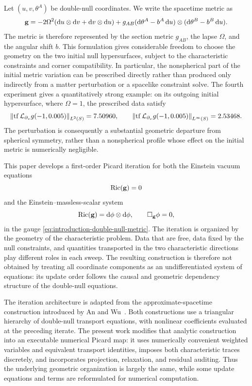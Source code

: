 Let $(u,v,\theta^A)$ be double-null coordinates.  We write the spacetime
metric as
\begin{equation}\label{eq:introduction-double-null-metric}
  \bg=-2\Omega^2(\dd u\otimes\dd v+\dd v\otimes\dd u)
  +g_{AB}(\dd\theta^A-b^A\dd u)\otimes
   (\dd\theta^B-b^B\dd u).
\end{equation}
The metric is therefore represented by the section metric $g_{AB}$, the
lapse $\Omega$, and the angular shift $b$.  This formulation gives
considerable freedom to choose the geometry on the two initial null
hypersurfaces, subject to the characteristic constraints and corner
compatibility.  In particular, the nonspherical part of the initial metric
variation can be prescribed directly rather than produced only indirectly
from a matter perturbation or a spacelike constraint solve.  The fourth
experiment gives a quantitatively strong example: on its outgoing initial
hypersurface, where $\Omega=1$, the prescribed data satisfy
\begin{equation}\label{eq:introduction-strong-asymmetry}
  \left\lVert \operatorname{tf}\mathcal L_{\partial_v}g(-1,0.005)\right\rVert_{L^2(S)}=7.50960,
  \qquad
  \left\lVert \operatorname{tf}\mathcal L_{\partial_v}g(-1,0.005)\right\rVert_{L^\infty(S)}=2.53468.
\end{equation}
The perturbation is consequently a substantial geometric departure from
spherical symmetry, rather than a nonspherical profile whose effect on the
initial metric is numerically negligible.

This paper develops a first-order Picard iteration for both the Einstein
vacuum equations
\begin{equation}
  \operatorname{Ric}(\mathbf g)=0
\end{equation}
and the Einstein--massless-scalar system
\begin{equation}
  \operatorname{Ric}(\mathbf g)=\mathop{}\!\mathrm d\phi\otimes\mathop{}\!\mathrm d\phi,
  \qquad \Box_{\mathbf g}\phi=0,
\end{equation}
in the gauge \eqref{eq:introduction-double-null-metric}.  The iteration is
organized by the geometry of the characteristic problem.  Data that are
free, data fixed by the null constraints, and quantities transported in the
two characteristic directions play different roles in each sweep.  The
resulting construction is therefore not obtained by treating all coordinate
components as an undifferentiated system of equations: its update order
follows the causal and geometric dependency structure of the double-null
equations.

The iteration architecture is adapted from the approximate-spacetime
construction introduced by An and Wu~\cite{wu-26}.  Both constructions use a
triangular hierarchy of double-null transport equations, with nonlinear
coefficients evaluated at the preceding iterate.  The present work modifies
that analytic construction into an executable numerical Picard map: it uses
numerically convenient weighted variables and equivalent transport
identities, imposes both characteristic traces discretely, and incorporates
projection, relaxation, and residual auditing.  Thus the underlying
geometric organization is largely the same, while some update equations and
terms are reformulated for numerical computation.

